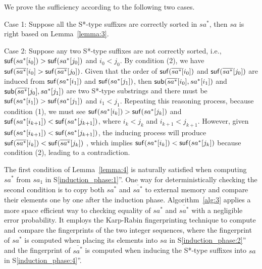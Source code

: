 \documentclass[10pt,journal,compsoc]{IEEEtran}
\begin{document}
\begin{IEEEproof}

    We prove the sufficiency according to the following two cases.

    Case 1: Suppose all the S*-type suffixes are correctly sorted in $sa^*$, then $sa$ is right based on Lemma~\ref{lemma:3}.

    Case 2: Suppose any two S*-type suffixes are not correctly sorted, i.e., ${\sf suf}(sa^*[i_0]) > {\sf suf}(sa^*[j_0])$ and $i_0 < j_0$. By condition (2), we have ${\sf suf}(\overline{sa^*}[i_0] > {\sf suf}(\overline{sa^*}[j_0])$. Given that the order of ${\sf suf}(\overline{sa^*}[i_0])$ and ${\sf suf}(\overline{sa^*}[j_0])$ are induced from ${\sf suf}(sa^*[i_1])$ and ${\sf suf}(sa^*[j_1])$, then ${\sf sub}(\overline{sa^*}[i_0], sa^*[i_1])$ and ${\sf sub}(\overline{sa^*}[j_0], sa^*[j_1])$ are two S*-type substrings and there must be ${\sf suf}(sa^*[i_1])>{\sf suf}(sa^*[j_1])$ and $i_1 < j_1$. Repeating this reasoning process, because condition (1), we must see ${\sf suf}(sa^*[i_k])>{\sf suf}(sa^*[j_k])$ and ${\sf suf}(sa^*[i_{k+1}])<{\sf suf}(sa^*[j_{k+1}])$, where $i_k < j_k$ and $i_{k+1} < j_{k+1}$. However, given ${\sf suf}(sa^*[i_{k+1}])<{\sf suf}(sa^*[j_{k+1}])$, the inducing process will produce ${\sf suf}(\overline{sa^*}[i_k])<{\sf suf}(\overline{sa^*}[j_k])$ , which implies ${\sf suf}(sa^*[i_k])<{\sf suf}(sa^*[j_k])$ because condition (2), leading to a contradiction.
	
\end{IEEEproof}
	

The first condition of Lemma~\ref{lemma:4} is naturally satisfied when computing $sa^*$ from $sa_1$ in S\ref{induction_phase:1}''. One way for deterministically checking the second condition is to copy both $sa^*$ and $\overline{sa^*}$ to external memory and compare their elements one by one after the induction phase. Algorithm~\ref{alg:3} applies a more space efficient way to checking equality of $sa^*$ and $\overline{sa^*}$ with a negligible error probability. It employs the Karp-Rabin fingerprinting technique to compute and compare the fingerprints of the two integer sequences, where the fingerprint of $sa^*$ is computed when placing its elements into $sa$ in S\ref{induction_phase:2}'' and the fingerprint of $\overline{sa^*}$ is computed when inducing the S*-type suffixes into $sa$ in S\ref{induction_phase:4}''. 


\end{document}
